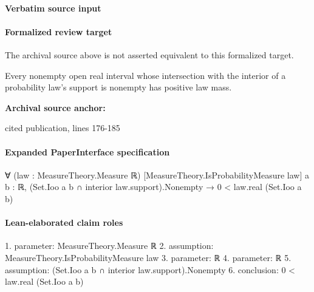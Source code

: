 \documentclass[10pt]{article}
\begin{document}
\paragraph{Verbatim source input}


\paragraph{Formalized review target}
The archival source above is not asserted equivalent to this formalized target.
\begin{ReviewVerbatim}
Every nonempty open real interval whose intersection with the interior of a probability law's support is nonempty has positive law mass.
\end{ReviewVerbatim}

\textbf{Archival source anchor:} {\footnotesize\raggedright cited publication, lines 176-\allowbreak{}185\par}
\paragraph{Expanded PaperInterface specification}
\begin{ReviewVerbatim}
∀ (law : MeasureTheory.Measure ℝ) [MeasureTheory.IsProbabilityMeasure law] {a b : ℝ},
  (Set.Ioo a b ∩ interior law.support).Nonempty → 0 < law.real (Set.Ioo a b)
\end{ReviewVerbatim}


\paragraph{Lean-elaborated claim roles}\begin{ReviewVerbatim}
1. parameter: MeasureTheory.Measure ℝ
2. assumption: MeasureTheory.IsProbabilityMeasure law
3. parameter: ℝ
4. parameter: ℝ
5. assumption: (Set.Ioo a b ∩ interior law.support).Nonempty
6. conclusion: 0 < law.real (Set.Ioo a b)
\end{ReviewVerbatim}
\end{document}
